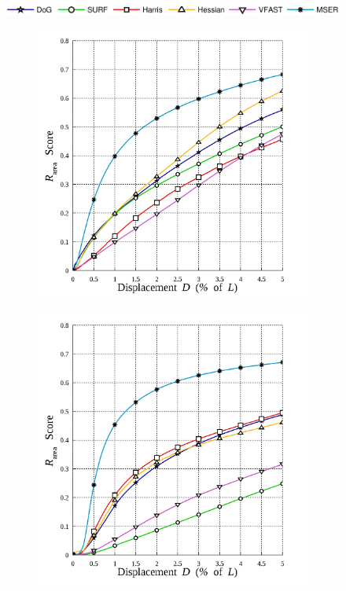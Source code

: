 \begin{figure}[ht]
	\centering
	\includegraphics[width=0.80\linewidth]{./fig/eval/hlegend.jpg}\\
	\begin{subfigure}[t]{0.49\linewidth}
		\centering 
		\includegraphics[width=0.95\linewidth]{./fig/eval/graph_oneshape.jpg}
		\label{fig/eval/graph_syn}
	\end{subfigure}
	\begin{subfigure}[t]{0.49\linewidth}
		\centering 
		\includegraphics[width=0.95\linewidth]{./fig/eval/graph_mri.jpg}

\end{subfigure}
\end{figure}
